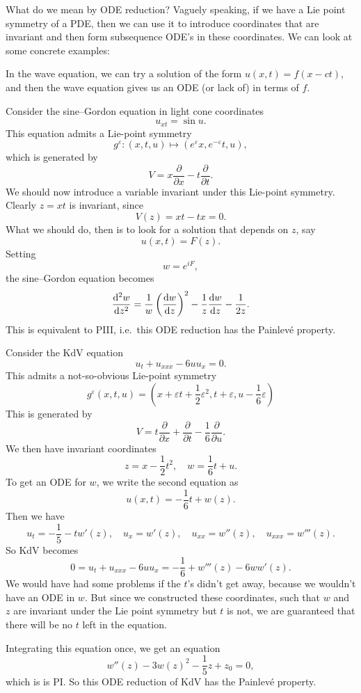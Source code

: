 \documentclass[a4paper]{article}
\begin{document}
What do we mean by ODE reduction? Vaguely speaking, if we have a Lie point symmetry of a PDE, then we can use it to introduce coordinates that are invariant and then form subsequence ODE's in these coordinates. We can look at some concrete examples:

\begin{eg}
  In the wave equation, we can try a solution of the form $u(x, t) = f(x - ct)$, and then the wave equation gives us an ODE (or lack of) in terms of $f$.
\end{eg}

\begin{eg}
  Consider the sine--Gordon equation in light cone coordinates
  \[
    u_{xt} = \sin u.
  \]
  This equation admits a Lie-point symmetry
  \[
    g^\varepsilon: (x, t, u) \mapsto (e^\varepsilon x, e^{-\varepsilon}t, u),
  \]
  which is generated by
  \[
    V = x \frac{\partial}{\partial x} - t \frac{\partial}{\partial t}.
  \]
  We should now introduce a variable invariant under this Lie-point symmetry. Clearly $z = xt$ is invariant, since
  \[
    V(z) = xt - tx = 0.
  \]
  What we should do, then is to look for a solution that depends on $z$, say
  \[
    u(x, t) = F(z).
  \]
  Setting
  \[
    w = e^{iF},
  \]
  the sine--Gordon equation becomes
  \[
    \frac{\mathrm{d}^2 w}{\mathrm{d} z^2} = \frac{1}{w} \left(\frac{\mathrm{d} w}{\mathrm{d} z}\right)^2 - \frac{1}{z} \frac{\mathrm{d} w}{\mathrm{d} z} - \frac{1}{2z}.
  \]
  This is equivalent to PIII, i.e.\ this ODE reduction has the Painlev\'e property.
\end{eg}

\begin{eg}
  Consider the KdV equation
  \[
    u_t + u_{xxx} - 6 uu_x = 0.
  \]
  This admits a not-so-obvious Lie-point symmetry
  \[
    g^\varepsilon (x, t, u) = \left(x + \varepsilon t + \frac{1}{2} \varepsilon^2, t + \varepsilon, u - \frac{1}{6} \varepsilon\right)
  \]
  This is generated by
  \[
    V = t \frac{\partial}{\partial x} + \frac{\partial}{\partial t} - \frac{1}{6} \frac{\partial}{\partial u}.
  \]
  We then have invariant coordinates
  \[
    z = x - \frac{1}{2}t^2,\quad w = \frac{1}{6} t + u.
  \]
  To get an ODE for $w$, we write the second equation as
  \[
    u(x, t) = - \frac{1}{6} t + w(z).
  \]
  Then we have
  \[
    u_t = - \frac{1}{5} - t w'(z),\quad u_x = w'(z),\quad u_{xx} = w''(z),\quad u_{xxx} = w'''(z).
  \]
  So KdV becomes
  \[
    0 = u_t + u_{xxx} - 6 uu_x = - \frac{1}{6} + w'''(z) - 6w w'(z).
  \]
  We would have had some problems if the $t$'s didn't get away, because we wouldn't have an ODE in $w$. But since we constructed these coordinates, such that $w$ and $z$ are invariant under the Lie point symmetry but $t$ is not, we are guaranteed that there will be no $t$ left in the equation.

  Integrating this equation once, we get an equation
  \[
    w''(z) - 3 w(z)^2 - \frac{1}{5}z + z_0 = 0,
  \]
  which is is PI. So this ODE reduction of KdV has the Painlev\'e property.
\end{eg}
\end{document}
